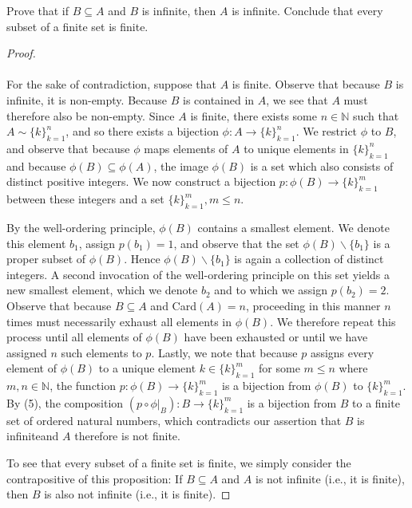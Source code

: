Prove that if $B\subseteq A$ and $B$ is infinite, then $A$ is infinite. 
Conclude that every subset of a finite set is finite.

\begin{proof}\ \\\\
    For the sake of contradiction, suppose that $A$ is finite. Observe that
    because $B$ is infinite, it is non-empty. Because $B$ is contained in $A$,
    we see that $A$ must therefore also be non-empty. Since $A$ is finite, there
    exists some $n \in \mathbb{N}$ such that $A \sim \{k\}_{k=1}^n$, and so
    there exists a bijection $\phi:A \to \{k\}_{k=1}^n$. We restrict $\phi$
    to $B$, and observe that because $\phi$ maps elements of $A$ to unique elements in 
    $\{k\}_{k=1}^n$ and because $\phi(B) \subseteq \phi(A)$, the image $\phi(B)$ is a set which
    also consists of distinct positive integers. We now construct a bijection $p:\phi(B) \to \{k\}_{k=1}^m$
     between these integers and a set $\{k\}_{k=1}^m, m \le n$.
    
    By the well-ordering principle, $\phi(B)$ contains a smallest element.
    We denote this element $b_1$, assign $p(b_1) = 1$, and observe that the set 
    $\phi(B) \backslash \{b_1\}$ is a proper subset of $\phi(B)$. Hence $\phi(B) \backslash \{b_1\}$
    is again a collection of distinct integers. A second invocation of the well-ordering
    principle on this set yields a new smallest element, which we denote $b_2$ and to which we assign 
    $p(b_2) = 2$.  Observe that because $B \subseteq A$ and Card$(A) = n$, proceeding in this 
    manner $n$ times must necessarily exhaust all elements in $\phi(B)$.  We therefore repeat this 
    process until all elements of $\phi(B)$ have been exhausted or until we have assigned $n$ such 
    elements to $p$. Lastly, we note that because $p$ assigns every element of $\phi(B)$ to a unique
    element $k \in \{k\}_{k=1}^m$ for some $m \le n$ where $m,n \in \mathbb{N}$, the function
    $p:\phi(B) \to \{k\}_{k=1}^m$ is a bijection from $\phi(B)$ to $\{k\}_{k=1}^m$. By (5), the
    composition $(p \circ \phi\vert_B):B \to \{k\}_{k=1}^m$ is a bijection from $B$ to a finite
    set of ordered natural numbers, which contradicts our assertion that $B$ is 
    infinite\footnotemark and $A$ therefore is not finite.

    To see that every subset of a finite set is finite, we simply consider the
    contrapositive of this proposition: If $B \subseteq A$ and $A$ is not
    infinite (i.e., it is finite), then $B$ is also not infinite (i.e., it is
    finite).
    
\end{proof}
